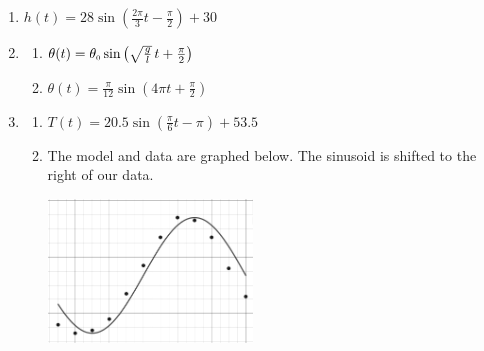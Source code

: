 \begin{enumerate}
\setcounter{enumi}{\value{HW}}





\item  $h(t) = 28\sin\left(\frac{2\pi}{3} t - \frac{\pi}{2}\right) + 30$


\item  \begin{multicols}{2}

\begin{enumerate}

\item  $\theta(t) = \theta_{\text{\tiny $0$}} \sin\left(\sqrt{\frac{g}{l}}\, t + \frac{\pi}{2}\right)$

\item  $\theta(t) = \frac{\pi}{12} \sin\left(4\pi t + \frac{\pi}{2}\right)$
\end{enumerate}
\end{multicols}

\item  \begin{enumerate} \item  $T(t) = 20.5 \sin\left(\frac{\pi}{6} t - \pi\right) + 53.5$ 

\item  The model and data are graphed below.  The sinusoid is shifted to the right of our data.

\begin{center}

 \includegraphics[height=1.5in]{./GraphsofSineandCosineGraphics/LakeErieTempReg.jpg} 


\end{center}
\end{enumerate}
\end{enumerate}
